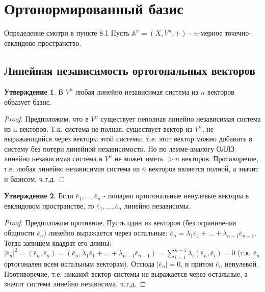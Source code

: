 \documentclass[a4paper, 12pt]{article}
\theoremstyle{definition}
\newtheorem*{subtheorem}{Утверждение}
\begin{document}
	\section{Ортонормированный базис}
	Определение смотри в пункте 8.1
	Пусть $\mathbb{A}^n = (X, V^n, +)$ - $n$-мерное точечно-евклидово пространство.
	\subsection{Линейная независимость ортогональных векторов}
	\begin{subtheorem}
		В $V^n$ любая линейно независимая система из $n$ векторов образует базис.
	\end{subtheorem}
	\begin{proof}
		Предположим, что в $V^n$ существует неполная линейно независимая система из n векторов. Т.к. система не полная, существует вектор из $V^n$, не выражающийся через векторы этой системы, т.е. этот вектор можно добавить в систему без потери линейной независимости. Но по лемме-аналогу ОЛЛЗ линейно независимая система в $V^n$ не может иметь $> n$ векторов. Противоречие, т.е. любая линейно независимая система из $n$ векторов является полной, а значит и базисом, ч.т.д. 
	\end{proof}
	\begin{subtheorem}
		Если $\bar{e}_{1},...,\bar{e}_{n}$ - попарно ортогональные ненулевые векторы в евклидовом пространстве, то $\bar{e}_{1},...,\bar{e}_{n}$ линейно независимы.
	\end{subtheorem}
	\begin{proof}
		Предположим противное. Пусть один из векторов (без ограничения общности $\bar{e}_{n}$) линейно выражается через остальные: $\bar{e}_{n} = \lambda_{1}\bar{e}_{1} +...+ \lambda_{n-1}\bar{e}_{n-1}$. Тогда запишем квадрат его длины:
		$|\bar{e}_{n}|^2 = (\bar{e}_{n}, \bar{e}_{n}) = (\bar{e}_{n}, \lambda_{1}\bar{e}_{1} +...+ \lambda_{n-1}\bar{e}_{n-1}) = \sum \limits_{i=1}^{n-1} \lambda_{i}(\bar{e}_{n}, \bar{e}_{i}) = 0$ (т.к. $\bar{e}_{n}$ ортогонален всем остальным векторам). Отсюда $|\bar{e}_{n}| = 0$, и притом $\bar{e}_{n}$ ненулевой. Противоречие, т.е. никакой вектор системы не выражается через остальные, а значит система линейно независима. ч.т.д.
	\end{proof}
\end{document}

